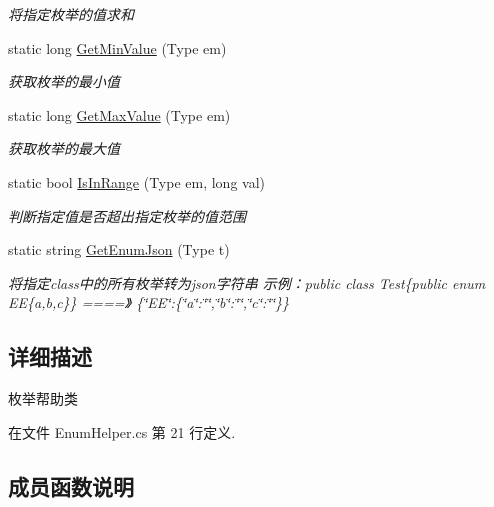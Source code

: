 \begin{DoxyCompactItemize}
\begin{DoxyCompactList}\small\item\em 将指定枚举的值求和 \end{DoxyCompactList}\item 
static long \hyperlink{class_x_c_l_net_tools_1_1_enum_1_1_enum_helper_a8111ec28e6283a2c1964b367b68351c2}{Get\+Min\+Value} (Type em)
\begin{DoxyCompactList}\small\item\em 获取枚举的最小值 \end{DoxyCompactList}\item 
static long \hyperlink{class_x_c_l_net_tools_1_1_enum_1_1_enum_helper_aa7edc75ec210b0c0740978a392e78b32}{Get\+Max\+Value} (Type em)
\begin{DoxyCompactList}\small\item\em 获取枚举的最大值 \end{DoxyCompactList}\item 
static bool \hyperlink{class_x_c_l_net_tools_1_1_enum_1_1_enum_helper_aff77ff22fe3efa1fbac6dd465ea67dc7}{Is\+In\+Range} (Type em, long val)
\begin{DoxyCompactList}\small\item\em 判断指定值是否超出指定枚举的值范围 \end{DoxyCompactList}\item 
static string \hyperlink{class_x_c_l_net_tools_1_1_enum_1_1_enum_helper_aad296fc07d735fa8507ec3d199432bd2}{Get\+Enum\+Json} (Type t)
\begin{DoxyCompactList}\small\item\em 将指定class中的所有枚举转为json字符串 示例：public class Test\{public enum EE\{a,b,c\}\} ====》 \{\char`\"{}\+E\+E\char`\"{}\+:\{\char`\"{}a\char`\"{}\+:\char`\"{}\char`\"{},\char`\"{}b\char`\"{}\+:\char`\"{}\char`\"{},\char`\"{}c\char`\"{}\+:\char`\"{}\char`\"{}\}\} \end{DoxyCompactList}\end{DoxyCompactItemize}


\subsection{详细描述}
枚举帮助类 



在文件 Enum\+Helper.\+cs 第 21 行定义.



\subsection{成员函数说明}
\mbox{\label{class_x_c_l_net_tools_1_1_enum_1_1_enum_helper_a8ee641787655d2b4f06cb51486ea8be3}} 
